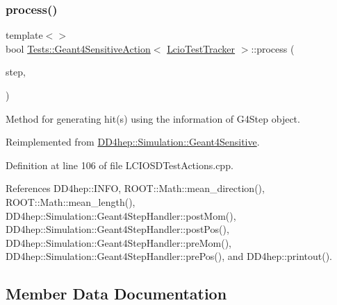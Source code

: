 \subsubsection{\texorpdfstring{process()}{process()}\hspace{0.1cm}{\footnotesize\ttfamily [2/2]}}
{\footnotesize\ttfamily template$<$$>$ \\
bool \hyperlink{class_tests_1_1_geant4_sensitive_action}{Tests\+::\+Geant4\+Sensitive\+Action}$<$ \hyperlink{class_tests_1_1_lcio_test_tracker}{Lcio\+Test\+Tracker} $>$\+::process (\begin{DoxyParamCaption}\item[{G4\+Step $\ast$}]{step,  }\item[{G4\+Touchable\+History $\ast$}]{ }\end{DoxyParamCaption})\hspace{0.3cm}{\ttfamily [virtual]}}



Method for generating hit(s) using the information of G4\+Step object. 



Reimplemented from \hyperlink{class_d_d4hep_1_1_simulation_1_1_geant4_sensitive_a9a9463a6c29a66dad43a52ffc9f7838d}{D\+D4hep\+::\+Simulation\+::\+Geant4\+Sensitive}.



Definition at line 106 of file L\+C\+I\+O\+S\+D\+Test\+Actions.\+cpp.



References D\+D4hep\+::\+I\+N\+FO, R\+O\+O\+T\+::\+Math\+::mean\+\_\+direction(), R\+O\+O\+T\+::\+Math\+::mean\+\_\+length(), D\+D4hep\+::\+Simulation\+::\+Geant4\+Step\+Handler\+::post\+Mom(), D\+D4hep\+::\+Simulation\+::\+Geant4\+Step\+Handler\+::post\+Pos(), D\+D4hep\+::\+Simulation\+::\+Geant4\+Step\+Handler\+::pre\+Mom(), D\+D4hep\+::\+Simulation\+::\+Geant4\+Step\+Handler\+::pre\+Pos(), and D\+D4hep\+::printout().



\subsection{Member Data Documentation}
\hypertarget{class_tests_1_1_geant4_sensitive_action_ab3efbf4bd030df529554961e46bb0823}{}\label{class_tests_1_1_geant4_sensitive_action_ab3efbf4bd030df529554961e46bb0823} 
